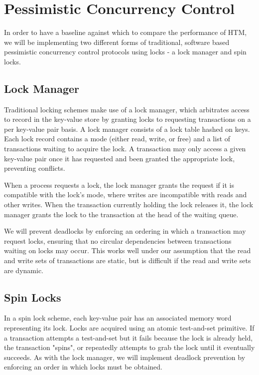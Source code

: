 \section{Pessimistic Concurrency Control} \label{sec:pessimistic}

In order to have a baseline against which to compare the performance of HTM, we
will be implementing two different forms of traditional, software based
pessimistic concurrency control protocols using locks - a lock manager and spin locks.

\subsection{Lock Manager}

Traditional locking schemes make use of a lock manager, which arbitrates access
to record in the key-value store by granting locks to requesting transactions on
a per key-value pair basis. A lock manager consists of a lock table hashed on
keys. Each lock record contains a mode (either read, write, or free) and a list
of transactions waiting to acquire the lock. A transaction may only access a
given key-value pair once it has requested and been granted the appropriate
lock, preventing conflicts.

When a process requests a lock, the lock manager grants the request if it is
compatible with the lock's mode, where writes are incompatible with reads and
other writes.  When the
transaction currently holding the lock releases it, the lock manager grants the
lock to the transaction at the head of the waiting queue.

We will prevent deadlocks by enforcing an ordering in which a transaction may
request locks, ensuring that no circular dependencies between transactions
waiting on locks may occur. This works well under our assumption that the read
and write sets of transactions are static, but is difficult if the read and
write sets are dynamic.\\

\subsection{Spin Locks}

In a spin lock scheme, each key-value pair has an associated memory word
representing its lock. Locks are acquired using an atomic test-and-set
primitive. If a transaction attempts a test-and-set but it fails because the
lock is already held, the transaction "spins", or repeatedly attempts to grab
the lock until it eventually succeeds. As with the lock manager, we will
implement deadlock prevention by enforcing an order in which locks must be
obtained.

